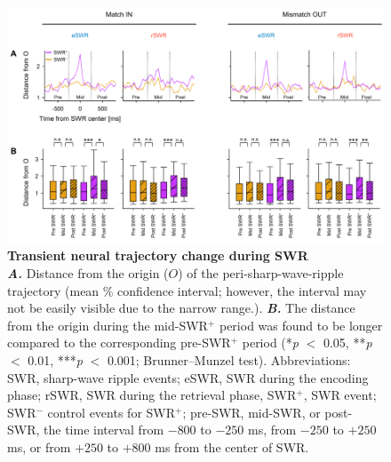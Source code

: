 \documentclass[final,3p,times,twocolumn]{elsarticle}
\begin{document}
        \clearpage
        \begin{figure}[ht]
        	\centering
            \includegraphics[width=1\textwidth]{./media/figures/.png/Figure_ID_05.png}
        	\caption{\textbf{
Transient neural trajectory change during SWR
}
\smallskip
\\
\textbf{\textit{A.}} Distance from the origin ($O$) of the peri-sharp-wave-ripple trajectory (mean \% confidence interval; however, the interval may not be easily visible due to the narrow range.).  \textbf{\textit{B.}}  The distance from the origin during the mid-SWR$^+$ period was found to be longer compared to the corresponding pre-SWR$^+$ period (*\textit{p} $<$ 0.05, **\textit{p} $<$ 0.01, ***\textit{p} $<$ 0.001; Brunner--Munzel test). Abbreviations: SWR, sharp-wave ripple events; eSWR, SWR during the encoding phase; rSWR, SWR during the retrieval phase, SWR$^+$, SWR event; SWR$^-$ control events for SWR$^+$; pre-SWR, mid-SWR, or post-SWR, the time interval from $-800$ to $-250$ ms, from $-250$ to $+250$ ms, or from $+250$ to $+800$ ms from the center of SWR.
}
        	\label{fig:05}
        \end{figure}
        \clearpage
\end{document}
